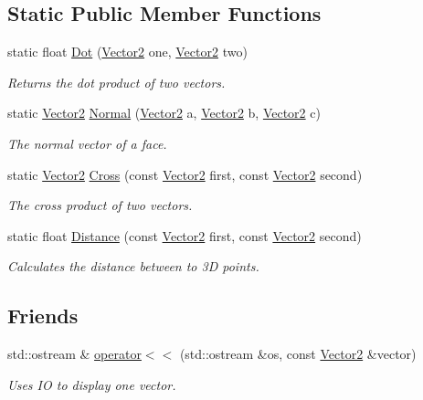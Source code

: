 \subsection*{Static Public Member Functions}
\begin{CompactItemize}
\item 
static float \hyperlink{struct_vector2_b4153e2451dacbb95a6f86fd3ef387a4}{Dot} (\hyperlink{struct_vector2}{Vector2} one, \hyperlink{struct_vector2}{Vector2} two)
\begin{CompactList}\small\item\em Returns the dot product of two vectors. \item\end{CompactList}\item 
static \hyperlink{struct_vector2}{Vector2} \hyperlink{struct_vector2_3e174796c3f77a15999999800feff8ce}{Normal} (\hyperlink{struct_vector2}{Vector2} a, \hyperlink{struct_vector2}{Vector2} b, \hyperlink{struct_vector2}{Vector2} c)
\begin{CompactList}\small\item\em The normal vector of a face. \item\end{CompactList}\item 
static \hyperlink{struct_vector2}{Vector2} \hyperlink{struct_vector2_841ba377f4b9e2765aadca82d4577261}{Cross} (const \hyperlink{struct_vector2}{Vector2} first, const \hyperlink{struct_vector2}{Vector2} second)
\begin{CompactList}\small\item\em The cross product of two vectors. \item\end{CompactList}\item 
static float \hyperlink{struct_vector2_80a99fd93db704d9b47f376a8568c86e}{Distance} (const \hyperlink{struct_vector2}{Vector2} first, const \hyperlink{struct_vector2}{Vector2} second)
\begin{CompactList}\small\item\em Calculates the distance between to 3D points. \item\end{CompactList}\end{CompactItemize}
\subsection*{Friends}
\begin{CompactItemize}
\item 
std::ostream \& \hyperlink{struct_vector2_9fc2efab2b5d63c84f76fa8f036bec0c}{operator$<$$<$} (std::ostream \&os, const \hyperlink{struct_vector2}{Vector2} \&vector)
\begin{CompactList}\small\item\em Uses IO to display one vector. \item\end{CompactList}\end{CompactItemize}


